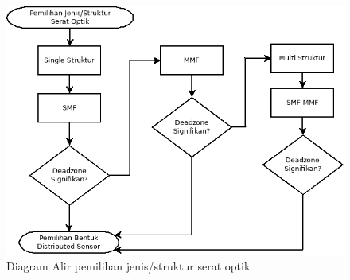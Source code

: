 \documentclass[12pt]{article}
\begin{document}
	\begin{figure}[h!]
		\centering
		\captionsetup{justification=centering}
		\includegraphics[width=0.8\linewidth]{images/Bab_3/Bab_3_6}
		\caption[Diagram Alir]{\small{Diagram Alir pemilihan jenis/struktur serat optik}}
	\end{figure}
	
%	
%	
%
%	
%
%	
\newpage
\end{document}
